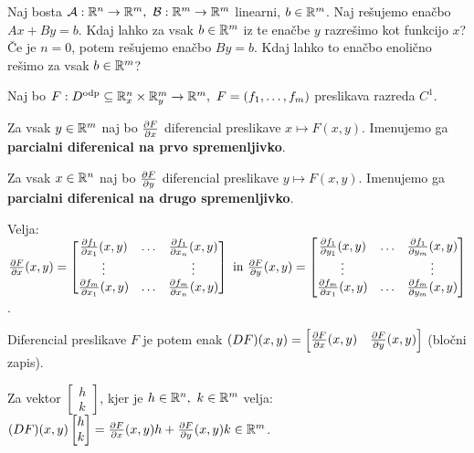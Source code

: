 \begin{primer}
    Naj bosta $\mathcal{A}: \mathbb{R}^n \to \mathbb{R}^m, \ \mathcal{B}: \mathbb{R}^m \to \mathbb{R}^m$ linearni, $b \in \mathbb{R}^m$. Naj rešujemo enačbo $Ax + By = b$. Kdaj lahko za vsak $b \in \mathbb{R}^m$ iz te  enačbe $y$ razrešimo kot funkcijo $x$? 
    Če je $n=0$, potem rešujemo enačbo $By = b$. Kdaj lahko to enačbo enolično rešimo za vsak $b \in \mathbb{R}^m$?
\end{primer}

Naj bo $F: D^\text{odp} \subseteq \mathbb{R}^n_x \times \mathbb{R}^m_y \to \mathbb{R}^m, \ F = (f_1, \ldots, f_m)$ preslikava razreda $C^1$. 

Za vsak $y \in \mathbb{R}^m$ naj bo $\frac{\partial F}{\partial x}$ diferencial preslikave $x \mapsto F(x,y)$. Imenujemo ga \textbf{parcialni diferenical na prvo spremenljivko}. 

Za vsak $x \in \mathbb{R}^n$ naj bo $\frac{\partial F}{\partial y}$ diferencial preslikave $y \mapsto F(x,y)$. Imenujemo ga \textbf{parcialni diferenical na drugo spremenljivko}. 

Velja: 
$\frac{\partial F}{\partial x}(x,y) = \begin{bmatrix}
    \frac{\partial f_1}{\partial x_1}(x,y) & \ldots & \frac{\partial f_1}{\partial x_n}(x,y) \\
    \vdots & & \vdots \\
    \frac{\partial f_m}{\partial x_1}(x,y) & \ldots & \frac{\partial f_m}{\partial x_n}(x,y) 
\end{bmatrix} \text{ in } \frac{\partial F}{\partial y}(x,y) = \begin{bmatrix}
    \frac{\partial f_1}{\partial y_1}(x,y) & \ldots & \frac{\partial f_1}{\partial y_m}(x,y) \\
    \vdots & & \vdots \\
    \frac{\partial f_m}{\partial x_1}(x,y) & \ldots & \frac{\partial f_m}{\partial y_m}(x,y) 
\end{bmatrix}$.

Diferencial preslikave $F$ je potem enak $(DF)(x,y) = \begin{bmatrix}
    \frac{\partial F}{\partial x}(x,y) & \frac{\partial F}{\partial y}(x,y)
\end{bmatrix}$ (bločni zapis).

\begin{opomba}
    Za vektor $\begin{bmatrix}
        h \\ k
    \end{bmatrix}$, kjer je $h \in \mathbb{R}^n, \ k \in \mathbb{R}^m$ velja: $(DF)(x,y)  \begin{bmatrix}
        h \\ k
    \end{bmatrix} = \frac{\partial F}{\partial x}(x,y)  h + \frac{\partial F}{\partial y}(x,y)  k \in \mathbb{R}^m$.
\end{opomba}

